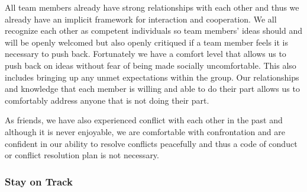 \documentclass{article}
\begin{document}
\par{ All team members already have strong relationships with each other and thus we already have an implicit framework for interaction and cooperation.
We all recognize each other as competent individuals so team members' ideas should and will be openly welcomed but also openly critiqued if a team
member feels it is necessary to push back. Fortunately we have a comfort level that allows us to push back on ideas without fear of being made socially
uncomfortable. This also includes bringing up any unmet expectations within the group. Our relationships and knowledge that each member is willing
and able to do their part allows us to comfortably address anyone that is not doing their part. \newline\newline\indent

As friends, we have also experienced conflict with each other in the past and although it is never enjoyable, we are comfortable with confrontation
and are confident in our ability to resolve conflicts peacefully and thus a code of conduct or conflict resolution plan is not necessary.}

\subsubsection*{Stay on Track}



\end{document}

